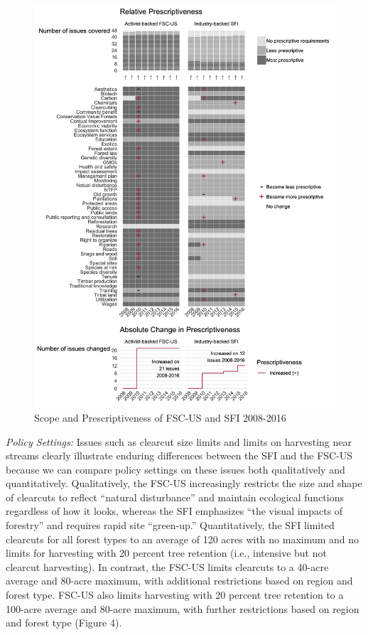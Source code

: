 \documentclass[
      12pt,
            Review ]{article}
\begin{document}
\begin{figure}
\centering
\includegraphics{FSC-SFI-1.png}
\caption{Scope and Prescriptiveness of FSC-US and SFI 2008-2016}
\end{figure}

\emph{Policy Settings:} Issues such as clearcut size limits and limits
on harvesting near streams clearly illustrate enduring differences
between the SFI and the FSC-US because we can compare policy settings on
these issues both qualitatively and quantitatively. Qualitatively, the
FSC-US increasingly restricts the size and shape of clearcuts to reflect
``natural disturbance'' and maintain ecological functions regardless of
how it looks, whereas the SFI emphasizes ``the visual impacts of
forestry'' and requires rapid site ``green-up.'' Quantitatively, the SFI
limited clearcuts for all forest types to an average of 120 acres with
no maximum and no limits for harvesting with 20 percent tree retention
(i.e., intensive but not clearcut harvesting). In contrast, the FSC-US
limits clearcuts to a 40-acre average and 80-acre maximum, with
additional restrictions based on region and forest type. FSC-US also
limits harvesting with 20 percent tree retention to a 100-acre average
and 80-acre maximum, with further restrictions based on region and
forest type (Figure 4).
\end{document}
